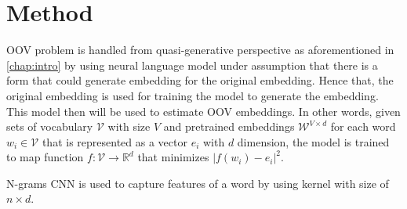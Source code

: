 \chapter{Method}
\label{chap:method}

OOV problem is handled from quasi-generative perspective as
aforementioned in \ref{chap:intro} by using neural language model
under assumption that there is a form that could generate embedding
for the original embedding. Hence that, the original embedding is used
for training the model to generate the embedding. This model then will
be used to estimate OOV embeddings. In other words, given sets of
vocabulary $\mathcal{V}$ with size $V$ and pretrained embeddings
$\mathcal{W}^{V \times d}$ for each word $w_{i} \in \mathcal{V}$ that
is represented as a vector $e_i$ with $d$ dimension, the model is
trained to map function $f:\mathcal{V} \rightarrow \mathbb{R}^d$ that
minimizes $\vert f(w_i) - e_i \vert^{2}$.

N-grams CNN is used to capture features of a word by using
kernel with size of $n \times d$.